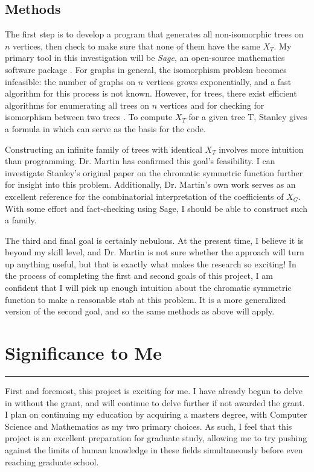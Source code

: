 \documentclass[a4paper,12pt]{article}
\begin{document}
\begin{spacing}{1}
\subsection*{Methods}
The first step is to develop a program that generates all non-isomorphic trees on $n$ vertices, then check to make sure that none of them have the same $X_T$. My primary tool in this investigation will be \emph{Sage}, an open-source mathematics software package \cite{sagemath}. For graphs in general, the isomorphism problem becomes infeasible: the number of graphs on $n$ vertices grows exponentially, and a fast algorithm for this process is not known. However, for trees, there exist efficient algorithms for enumerating all trees on $n$ vertices \cite{generatefreetrees} and for checking for isomorphism between two trees \cite{Buss97alogtimealgorithms}. To compute $X_T$ for a given tree T, Stanley gives a formula in \cite{csfstanley} which can serve as the basis for the code.

Constructing an infinite family of trees with identical $X_T$ involves more intuition than programming. Dr. Martin has confirmed this goal's feasibility. I can investigate Stanley's original paper on the chromatic symmetric function further for insight into this problem. Additionally, Dr. Martin's own work serves as an excellent reference for the combinatorial interpretation of the coefficients of $X_G$. With some effort and fact-checking using Sage, I should be able to construct such a family.

The third and final goal is certainly nebulous. At the present time, I believe it is beyond my skill level, and Dr. Martin is not sure whether the approach will turn up anything useful, but that is exactly what makes the research so exciting! In the process of completing the first and second goals of this project, I am confident that I will pick up enough intuition about the chromatic symmetric function to make a reasonable stab at this problem. It is a more generalized version of the second goal, and so the same methods as above will apply.

\section*{\Large Significance to Me}
\hrule
\vspace{0.4cm}
First and foremost, this project is exciting for me. I have already begun to delve in without the grant, and will continue to delve further if not awarded the grant. I plan on continuing my education by acquiring a masters degree, with Computer Science and Mathematics as my two primary choices. As such, I feel that this project is an excellent preparation for graduate study, allowing me to try pushing against the limits of human knowledge in these fields simultaneously before even reaching graduate school.


\end{spacing}
\end{document}
